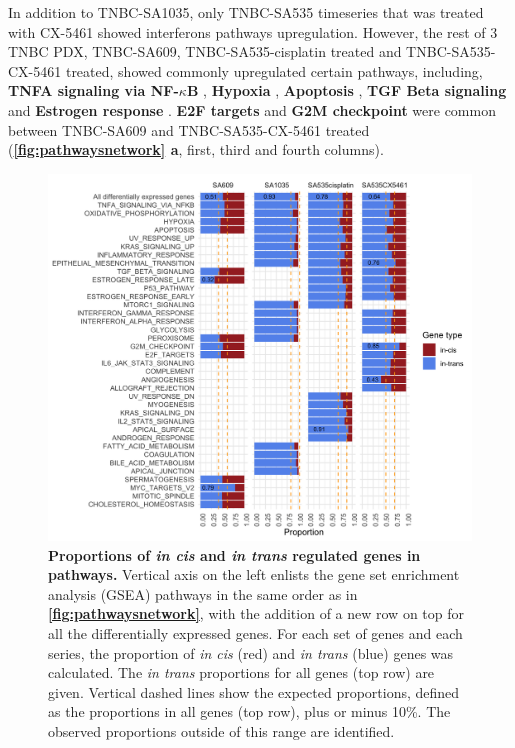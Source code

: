 In addition to TNBC-SA1035, only TNBC-SA535 timeseries that was treated with CX-5461 showed interferons pathways upregulation. However, the rest of 3 TNBC PDX, TNBC-SA609, TNBC-SA535-cisplatin treated and TNBC-SA535-CX-5461 treated, showed commonly upregulated certain pathways, including, \textbf{TNFA signaling via NF-$\kappa$B} \cite{lagunas2008nuclear,ito2015down, ryan2019targeting}, \textbf{Hypoxia} \cite{lee2012hypoxia, mcevoy2015identifying, deben2018hypoxia,li2019erk}, \textbf{Apoptosis} \cite{panaretakis2012cisplatin}, \textbf{TGF Beta signaling} \cite{zhang2019tgfbeta1} and \textbf{Estrogen response} \cite{zhu2018er}. \textbf{E2F targets} \cite{zheng2020upregulation} and \textbf{G2M checkpoint} \cite{visconti2016cell} were common between TNBC-SA609 and TNBC-SA535-CX-5461 treated (\textbf{\autoref{fig:pathwaysnetwork} a}, first, third and fourth columns). 



\begin{figure}
\centering
  \includegraphics[width=\textwidth]{Figures/chap5/cistransproportionsinpathways.png}
\caption[Proportions of \textit{in cis} and \textit{in trans} regulated genes in pathways]
	{\small
	\textbf{Proportions of \textit{in cis} and \textit{in trans} regulated genes in pathways.}
	 	Vertical axis on the left enlists the gene set enrichment analysis (GSEA) pathways in the same order as in \textbf{\autoref{fig:pathwaysnetwork}}, with the addition of a new row on top for all the differentially expressed genes. For each set of genes and each series, the proportion of \textit{in cis} (red) and \textit{in trans} (blue) genes was calculated. The \textit{in trans} proportions for all genes (top row) are given. Vertical dashed lines show the expected proportions, defined as the proportions in all genes (top row), plus or minus 10\%. The observed proportions outside of this range are identified. 
	}
	\label{fig:cistransproportionsinpathways}
\end{figure}


